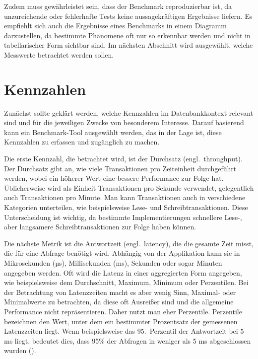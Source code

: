 Zudem muss gewährleistet sein, dass der Benchmark reproduzierbar ist, da unzureichende oder fehlerhafte Tests keine aussagekräftigen Ergebnisse liefern.
Es empfiehlt sich auch die Ergebnisse eines Benchmarks in einem Diagramm darzustellen, da bestimmte Phänomene oft nur so erkennbar werden und nicht in tabellarischer Form sichtbar sind.
Im nächsten Abschnitt wird ausgewählt, welche Messwerte betrachtet werden sollen.

\section{Kennzahlen}\label{sec:einleitung-kennzahlen}

Zunächst sollte geklärt werden, welche Kennzahlen im Datenbankkontext relevant sind und für die jeweiligen Zwecke von besonderem Interesse.
Darauf basierend kann ein Benchmark-Tool ausgewählt werden, das in der Lage ist, diese Kennzahlen zu erfassen und zugänglich zu machen.

Die erste Kennzahl, die betrachtet wird, ist der Durchsatz (engl.\ throughput).
Der Durchsatz gibt an, wie viele Transaktionen pro Zeiteinheit durchgeführt werden, wobei ein höherer Wert eine bessere Performance zur Folge hat.
Üblicherweise wird als Einheit Transaktionen pro Sekunde verwendet, gelegentlich auch Transaktionen pro Minute.
Man kann Transaktionen auch in verschiedene Kategorien unterteilen, wie beispielsweise Lese- und Schreibtransaktionen.
Diese Unterscheidung ist wichtig, da bestimmte Implementierungen schnellere Lese-, aber langsamere Schreibtransaktionen zur Folge haben können.

Die nächste Metrik ist die Antwortzeit (engl.\ latency), die die gesamte Zeit misst, die für eine Abfrage benötigt wird.
Abhängig von der Applikation kann sie in Mikrosekunden (µs), Millisekunden (ms), Sekunden oder sogar Minuten angegeben werden.
Oft wird die Latenz in einer aggregierten Form angegeben, wie beispielsweise dem Durchschnitt, Maximum, Minimum oder Perzentilen.
Bei der Betrachtung von Latenzzeiten macht es aber wenig Sinn, Maximal- oder Minimalwerte zu betrachten, da diese oft Ausreißer sind und die allgemeine Performance nicht repräsentieren.
Daher nutzt man eher Perzentile.
Perzentile bezeichnen den Wert, unter dem ein bestimmter Prozentsatz der gemessenen Latenzzeiten liegt.
Wenn beispielsweise das 95.\ Perzentil der Antwortzeit bei 5 ms liegt, bedeutet dies, dass 95\% der Abfragen in weniger als 5 ms abgeschlossen wurden (\cite{perzentil_erklaerung}).

